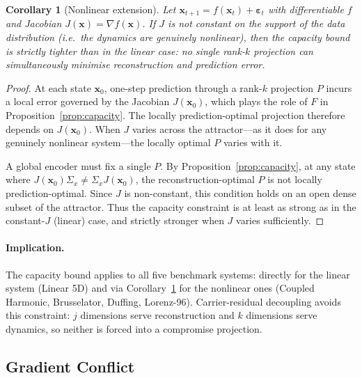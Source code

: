 \documentclass{article}
\newtheorem{corollary}{Corollary}
\begin{document}
\begin{corollary}[Nonlinear extension]
\label{cor:nonlinear}
Let $\mathbf{x}_{t+1} = f(\mathbf{x}_t) + \boldsymbol{\varepsilon}_t$
with differentiable $f$ and Jacobian
$J(\mathbf{x}) = \nabla f(\mathbf{x})$.
If $J$ is not constant on the support of the data distribution
(i.e.\ the dynamics are genuinely nonlinear), then the capacity
bound is strictly tighter than in the linear case: no single
rank-$k$ projection can simultaneously minimise reconstruction
and prediction error.
\end{corollary}

\begin{proof}
At each state $\mathbf{x}_0$, one-step prediction through a rank-$k$
projection $P$ incurs a local error governed by the Jacobian
$J(\mathbf{x}_0)$, which plays the role of $F$ in
Proposition~\ref{prop:capacity}.
The locally prediction-optimal projection therefore depends on
$J(\mathbf{x}_0)$.
When $J$ varies across the attractor---as it does for any
genuinely nonlinear system---the locally optimal $P$ varies with it.

A global encoder must fix a single $P$.  By
Proposition~\ref{prop:capacity}, at any state where
$J(\mathbf{x}_0)\Sigma_x \neq \Sigma_x J(\mathbf{x}_0)$,
the reconstruction-optimal $P$ is not locally prediction-optimal.
Since $J$ is non-constant, this condition holds
on an open dense subset of the attractor.
Thus the capacity constraint is at least as strong as in the
constant-$J$ (linear) case, and strictly stronger when $J$
varies sufficiently.
\end{proof}

\paragraph{Implication.}
The capacity bound applies to all five benchmark systems: directly
for the linear system (Linear 5D) and via
Corollary~\ref{cor:nonlinear} for the nonlinear ones
(Coupled Harmonic, Brusselator, Duffing, Lorenz-96).
Carrier-residual decoupling avoids this constraint: $j$ dimensions
serve reconstruction and $k$ dimensions serve dynamics, so neither
is forced into a compromise projection.


\subsection{Gradient Conflict}
\label{sec:gradient-conflict}
\end{document}
